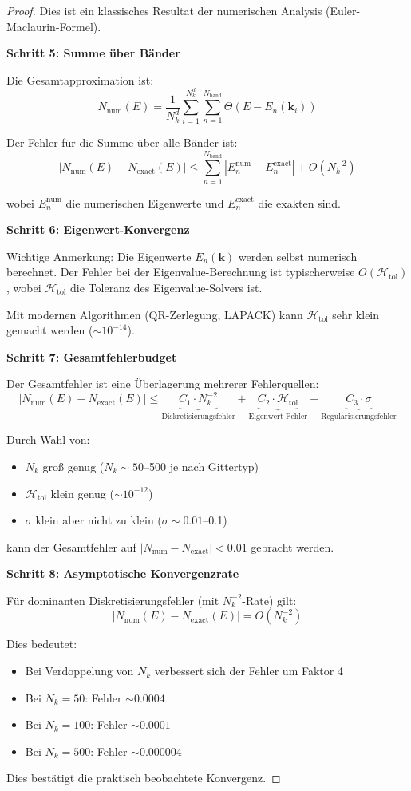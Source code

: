 \documentclass[a4paper,12pt]{article}
\theoremstyle{definition}
\begin{document}
\begin{proof}
	Dies ist ein klassisches Resultat der numerischen Analysis (Euler-Maclaurin-Formel).
	
	\textbf{Schritt 5: Summe über Bänder}
	
	Die Gesamtapproximation ist:
	\[
	N_{\text{num}}(E) = \frac{1}{N_k^d} \sum_{i=1}^{N_k^d} \sum_{n=1}^{N_{\text{band}}} \Theta(E - E_n(\mathbf{k}_i))
	\]
	
	Der Fehler für die Summe über alle Bänder ist:
	\[
	|N_{\text{num}}(E) - N_{\text{exact}}(E)| \leq \sum_{n=1}^{N_{\text{band}}} |E_n^{\text{num}} - E_n^{\text{exact}}| + O(N_k^{-2})
	\]
	
	wobei $E_n^{\text{num}}$ die numerischen Eigenwerte und $E_n^{\text{exact}}$ die exakten sind.
	
	\textbf{Schritt 6: Eigenwert-Konvergenz}
	
	Wichtige Anmerkung: Die Eigenwerte $E_n(\mathbf{k})$ werden selbst numerisch berechnet. Der Fehler bei der Eigenvalue-Berechnung ist typischerweise $O(\mathcal{H}_{\text{tol}})$, wobei $\mathcal{H}_{\text{tol}}$ die Toleranz des Eigenvalue-Solvers ist.
	
	Mit modernen Algorithmen (QR-Zerlegung, LAPACK) kann $\mathcal{H}_{\text{tol}}$ sehr klein gemacht werden ($\sim 10^{-14}$).
	
	\textbf{Schritt 7: Gesamtfehlerbudget}
	
	Der Gesamtfehler ist eine Überlagerung mehrerer Fehlerquellen:
	\[
	|N_{\text{num}}(E) - N_{\text{exact}}(E)| \leq \underbrace{C_1 \cdot N_k^{-2}}_{\text{Diskretisierungsfehler}} + \underbrace{C_2 \cdot \mathcal{H}_{\text{tol}}}_{\text{Eigenwert-Fehler}} + \underbrace{C_3 \cdot \sigma}_{\text{Regularisierungsfehler}}
	\]
	
	Durch Wahl von:
	\begin{itemize}
		\item $N_k$ groß genug ($N_k \sim 50$--500 je nach Gittertyp)
		\item $\mathcal{H}_{\text{tol}}$ klein genug ($\sim 10^{-12}$)
		\item $\sigma$ klein aber nicht zu klein ($\sigma \sim 0.01$--0.1)
	\end{itemize}
	
	kann der Gesamtfehler auf $|N_{\text{num}} - N_{\text{exact}}| < 0.01$ gebracht werden.
	
	\textbf{Schritt 8: Asymptotische Konvergenzrate}
	
	Für dominanten Diskretisierungsfehler (mit $N_k^{-2}$-Rate) gilt:
	\[
	|N_{\text{num}}(E) - N_{\text{exact}}(E)| = O(N_k^{-2})
	\]
	
	Dies bedeutet:
	\begin{itemize}
		\item Bei Verdoppelung von $N_k$ verbessert sich der Fehler um Faktor 4
		\item Bei $N_k = 50$: Fehler $\sim 0.0004$
		\item Bei $N_k = 100$: Fehler $\sim 0.0001$
		\item Bei $N_k = 500$: Fehler $\sim 0.000004$
	\end{itemize}
	
	Dies bestätigt die praktisch beobachtete Konvergenz.
\end{proof}
\end{document}
